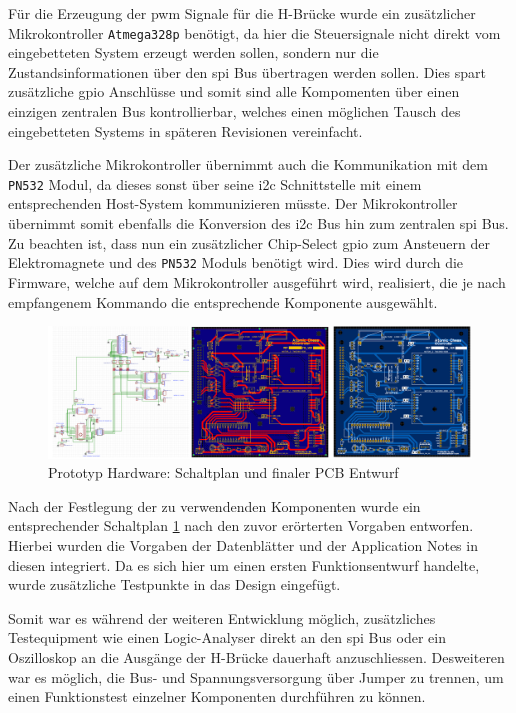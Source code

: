 Für die Erzeugung der \gls{pwm} Signale für die H-Brücke wurde ein
zusätzlicher Mikrokontroller \passthrough{\lstinline!Atmega328p!}
benötigt, da hier die Steuersignale nicht direkt vom eingebetteten
System erzeugt werden sollen, sondern nur die Zustandsinformationen über
den \gls{spi} Bus übertragen werden sollen. Dies spart zusätzliche
\gls{gpio} Anschlüsse und somit sind alle Kompomenten über einen
einzigen zentralen Bus kontrollierbar, welches einen möglichen Tausch
des eingebetteten Systems in späteren Revisionen vereinfacht.

Der zusätzliche Mikrokontroller übernimmt auch die Kommunikation mit dem
\passthrough{\lstinline!PN532!} Modul, da dieses sonst über seine
\gls{i2c} Schnittstelle mit einem entsprechenden Host-System
kommunizieren müsste. Der Mikrokontroller übernimmt somit ebenfalls die
Konversion des \gls{i2c} Bus hin zum zentralen \gls{spi} Bus. Zu
beachten ist, dass nun ein zusätzlicher Chip-Select \gls{gpio} zum
Ansteuern der Elektromagnete und des \passthrough{\lstinline!PN532!}
Moduls benötigt wird. Dies wird durch die Firmware, welche auf dem
Mikrokontroller ausgeführt wird, realisiert, die je nach empfangenem
Kommando die entsprechende Komponente ausgewählt.

\begin{figure}
\centering
\includegraphics{images/ATC_DK_HW_SCHEM.png}
\caption{Prototyp Hardware: Schaltplan und finaler PCB Entwurf
\label{ATC_Schematic_DK}}
\end{figure}

Nach der Festlegung der zu verwendenden Komponenten wurde ein
entsprechender Schaltplan \ref{ATC_Schematic_DK} nach den zuvor
erörterten Vorgaben entworfen. Hierbei wurden die Vorgaben der
Datenblätter\cite{tmc5160db}\cite{atmega328pdb} und der
Application Notes \cite{pn532apn}\cite{drv8833apn} in diesen
integriert. Da es sich hier um einen ersten Funktionsentwurf handelte,
wurde zusätzliche Testpunkte in das Design eingefügt.

Somit war es während der weiteren Entwicklung möglich, zusätzliches
Testequipment wie einen Logic-Analyser direkt an den \gls{spi} Bus oder
ein Oszilloskop an die Ausgänge der H-Brücke dauerhaft anzuschliessen.
Desweiteren war es möglich, die Bus- und Spannungsversorgung über Jumper
zu trennen, um einen Funktionstest einzelner Komponenten durchführen zu
können.

